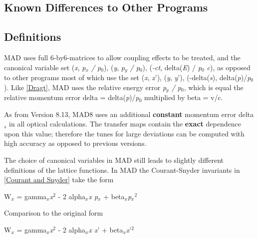 




\subsection{Known Differences to Other Programs}

\subsection{Definitions} MAD uses full 6-by6-matrices to allow coupling effects to be treated, and the canonical variable set (\textit{x}, \textit{p$_x$ / p$_0$}), (\textit{y}, \textit{p$_y$ / p$_0$}), (\textit{-ct}, delta(\textit{E}) / \textit{p$_0$ c}), as opposed to other programs most of which use the set (\textit{x}, \textit{x}'), (\textit{y}, \textit{y}'),  (-delta(\textit{s}), delta(\textit{p})/\textit{p$_0$}). Like \href{bibliography.html#dragt}{[Dragt]}, MAD uses the relative energy error \textit{p$_y$ / p$_0$}, which is equal the relative momentum error  delta = delta(\textit{p})/\textit{p$_0$} multiplied by beta = v/c. 

 As from Version 8.13, MAD8 uses an additional \textbf{constant} momentum error delta$_\textit{s}$ in all optical calculations. The transfer maps contain the \textbf{exact} dependence upon this value; therefore the tunes for large deviations can be computed with high accuracy as opposed to previous versions. 

 The choice of canonical variables in MAD still leads to slightly different definitions of the lattice functions. In MAD the Courant-Snyder invariants in \href{bibliography.html#courant}{[Courant and Snyder]} take the form 

 W$_x$ = gamma$_\textit{x}$\textit{x}$^2$ - 2 alpha$_\textit{x}$\textit{x p$_x$} + beta$_\textit{x}$\textit{p$_x$}$^2$

 Comparison to the original form 

 W$_x$ = gamma$_\textit{x}$\textit{x}$^2$ - 2 alpha$_\textit{x}$\textit{x x}' + beta$_\textit{x}$\textit{x}'$^2$

